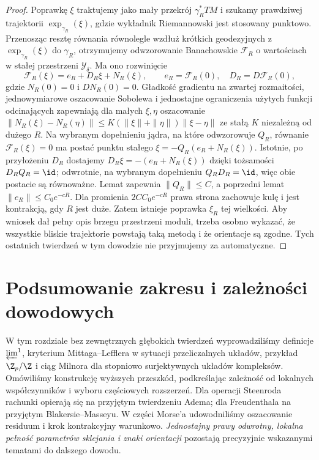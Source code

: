 \begin{proof}
Poprawkę $\xi$ traktujemy jako mały przekrój
$\gamma_R^*TM$ i szukamy prawdziwej trajektorii
$\exp_{\gamma_R}(\xi)$, gdzie wykładnik
Riemannowski jest stosowany punktowo.
Przenosząc resztę równania równolegle wzdłuż
krótkich geodezyjnych z $\exp_{\gamma_R}(\xi)$
do $\gamma_R$, otrzymujemy odwzorowanie
Banachowskie $\mathcal F_R$ o wartościach
w stałej przestrzeni $\mathcal Y_\delta$.
Ma ono rozwinięcie
\[
\mathcal F_R(\xi)=e_R+D_R\xi+N_R(\xi),
\qquad e_R=\mathcal F_R(0),\quad
D_R=D\mathcal F_R(0),
\]
gdzie $N_R(0)=0$ i $DN_R(0)=0$.
Gładkość gradientu na zwartej rozmaitości,
jednowymiarowe oszacowanie Sobolewa
i jednostajne ograniczenia użytych funkcji
odcinających zapewniają dla małych
$\xi,\eta$ oszacowanie
$\|N_R(\xi)-N_R(\eta)\|
\le K(\|\xi\|+\|\eta\|)\|\xi-\eta\|$
ze stałą $K$ niezależną od dużego $R$.
Na wybranym dopełnieniu jądra, na które
odwzorowuje $Q_R$, równanie
$\mathcal F_R(\xi)=0$ ma postać punktu stałego
$\xi=-Q_R(e_R+N_R(\xi))$.
Istotnie, po przyłożeniu $D_R$ dostajemy
$D_R\xi=-(e_R+N_R(\xi))$
dzięki tożsamości $D_RQ_R=\id$;
odwrotnie, na wybranym dopełnieniu
$Q_RD_R=\id$, więc obie postacie są równoważne.
Lemat zapewnia $\|Q_R\|\le C$, a poprzedni lemat
$\|e_R\|\le C_0e^{-cR}$. Dla promienia
$2CC_0e^{-cR}$ prawa strona zachowuje kulę i jest
kontrakcją, gdy $R$ jest duże. Zatem istnieje poprawka
$\xi_R$ tej wielkości. Aby wniosek dał pełny opis
brzegu przestrzeni moduli, trzeba osobno wykazać, że
wszystkie bliskie trajektorie powstają taką metodą i że
orientacje są zgodne. Tych ostatnich twierdzeń w tym
dowodzie nie przyjmujemy za automatyczne.
\end{proof}

\section{Podsumowanie zakresu i zależności dowodowych}
W tym rozdziale bez zewnętrznych głębokich twierdzeń
wyprowadziliśmy definicje $\varprojlim^1$, kryterium
Mittaga--Lefflera w sytuacji przeliczalnych układów,
przykład $\Z_p/\Z$ i ciąg Milnora dla stopniowo surjektywnych
układów kompleksów. Omówiliśmy konstrukcję
wyższych przeszkód, podkreślając zależność od lokalnych
współczynników i wyboru częściowych rozszerzeń.
Dla operacji Steenroda rachunki opierają się na
przyjętym twierdzeniu Adema; dla Freudenthala na
przyjętym Blakersie--Masseyu.
W części Morse'a udowodniliśmy oszacowanie residuum i
krok kontrakcyjny warunkowo. \emph{Jednostajny prawy odwrotny,
lokalna pełność parametrów sklejania i znaki orientacji}
pozostają precyzyjnie wskazanymi tematami do dalszego dowodu.

\appendix
\renewcommand{\chaptermark}[1]{\markboth{Dodatek \thechapter}{}}
